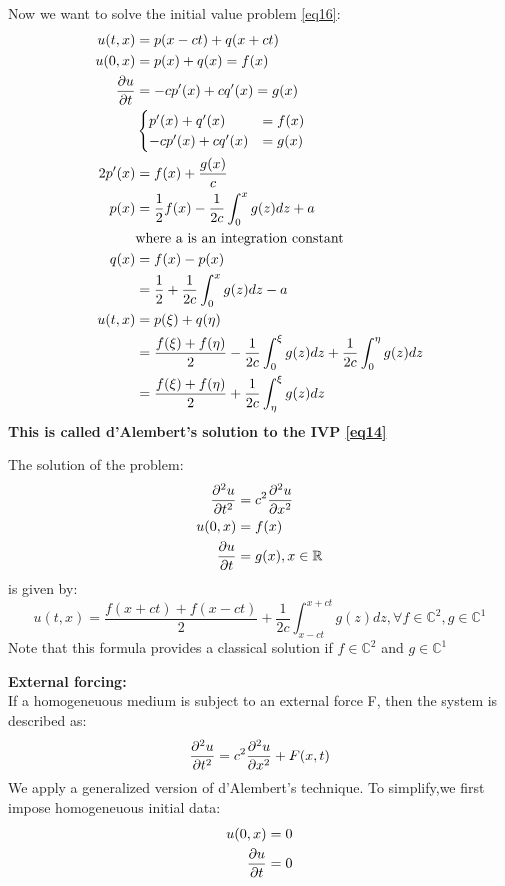 Now we want to solve the initial value problem \eqref{eq16}:
\begin{align*}{}{}
u(t,x)&=p(x-ct)+q(x+ct)\\
u(0,x)&=p(x)+q(x)=f(x)\\
\pdv{u}{t}(0,x)&=-cp'(x)+cq'(x)=g(x)\\
&\begin{cases}
    p'(x)+q'(x)&=f(x)\\
    -cp'(x)+cq'(x)&=g(x)
\end{cases}\\
2p'(x)&=f(x)+\frac{g(x)}{c}\\
p(x)&=\frac{1}{2}f(x)-\frac{1}{2c}\int_{0}^{x}g(z)dz+a\\
&\text{where a is an integration constant}\\
q(x)&=f(x)-p(x)\\
&=\frac{1}{2}+\frac{1}{2c}\int_{0}^{x}g(z)dz-a\\
u(t,x)&=p(\xi)+q(\eta)\\
&=\frac{f(\xi)+f(\eta)}{2}-\frac{1}{2c}\int_{0}^{\xi}g(z)dz+\frac{1}{2c}\int_{0}^{\eta}g(z)dz\\
&=\frac{f(\xi)+f(\eta)}{2}+\frac{1}{2c}\int_{\eta}^{\xi}g(z)dz
\end{align*}
\textbf{This is called d'Alembert's solution to the IVP \eqref{eq14}}
\begin{theorem}{}
The solution of the problem:
\begin{align*}{}{}
\pdv[2]{u}{t}&=c^2\pdv[2]{u}{x}\\
u(0,x)&=f(x)\\
\pdv{u}{t}(0,x)&=g(x),x\in \mathbb{R}
\end{align*}
is given by:
$$
    u(t,x)=\frac{f(x+ct)+f(x-ct)}{2}+\frac{1}{2c}\int_{x-ct}^{x+ct}g(z)dz, \forall f\in \mathbb{C}^2, g\in \mathbb{C}^1
$$ 
Note that this formula provides a classical solution if $ f\in \mathbb{C}^2 $ and $ g\in \mathbb{C}^1 $ 
\end{theorem}
\textbf{External forcing:}
\\If a homogeneuous medium is subject to an external force F, then the system is described as:
\begin{equation}
   \label{eq17} \pdv[2]{u}{t}=c^2\pdv[2]{u}{x}+F(x,t)
\end{equation}
We apply a generalized version of d'Alembert's technique. To simplify,we first impose homogeneuous initial data:
\begin{align*}{}{}
u(0,x)&=0\\
\pdv{u}{t}(0,x)&=0\\
\end{align*}

